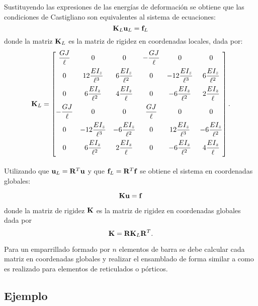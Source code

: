 Sustituyendo las expresiones de las energías de deformación se obtiene que las condiciones de Castigliano son equivalentes al sistema de ecuaciones:
\begin{equation}
{\bf K}_L {\bf u}_L = {\bf f}_L
\end{equation}
%
donde la matriz ${\bf K}_L$ es la matriz de rigidez en coordenadas locales, dada por:
%
\begin{equation}\label{eqn:matrigtf}
	{\bf K}_L = \left[
	\begin{matrix}
		\dfrac{GJ}{\ell} & 0 & 0 & - \dfrac{GJ}{\ell} & 0 & 0 \\[3mm]
		0 &  12 \dfrac{EI_z}{\ell^{3}} & 6 \dfrac{EI_z}{\ell^{2}} &  0& -12 \dfrac{EI_z}{\ell^{3}} & 6 \dfrac{EI_z}{\ell^{2}} \\[3mm]
		0 &  6 \dfrac{EI_z}{\ell^{2}} & 4 \dfrac{EI_z}{\ell} & 0& -6 \dfrac{EI_z}{\ell^{2}} & 2 \dfrac{EI_z}{\ell} \\[3mm]
		-\dfrac{GJ}{\ell} & 0 & 0 &  \dfrac{GJ}{\ell} & 0 & 0 \\[3mm]
		0 &  -12 \dfrac{EI_z}{\ell^{3}} & -6 \dfrac{EI_z}{\ell^{2}} &0&  12 \dfrac{EI_z}{\ell^{3}} & -6 \dfrac{EI_z}{\ell^{2}} \\[3mm]
		0 &  6 \dfrac{EI_z}{\ell^{2}} & 2 \dfrac{EI_z}{\ell} & 0 & -6 \dfrac{EI_z}{\ell^{2}} & 4 \dfrac{EI_z}{\ell} \\[3mm]
	\end{matrix}
	\right].
\end{equation}

Utilizando que ${\bf u}_L = {\bf R}^T {\bf u}$  y que  ${\bf f}_L = {\bf R}^T {\bf f}$  se obtiene el sistema en coordenadas globales:

\begin{equation}
{\bf K} {\bf u} = {\bf f}
\end{equation}

donde la matriz de rigidez ${\bf K}$ es la matriz de rigidez en coordenadas globales dada por
\begin{equation}\label{eqn:matrigtfglo}
{\bf K} = {\bf R} {\bf K}_L {\bf R}^T.
\end{equation}

Para un emparrillado formado por $n$ elementos de barra se debe calcular cada matriz en coordenadas globales y realizar el ensamblado de forma similar a como es realizado para elementos de reticulados o pórticos. %
%

\subsection{Ejemplo}

